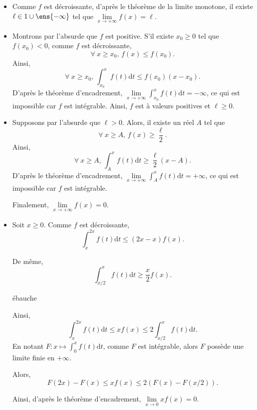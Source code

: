 \begin{elem_sol}
\begin{itemize}
\item Comme $f$ est décroissante, d'après le théorème de la limite monotone, il existe $\ell \in \R \cup \ens{-\infty}$ tel que $\lim\limits_{x\to+\infty} f(x) = \ell$.

\item Montrons par l'absurde que $f$ est positive. S'il existe $x_0 \geq 0$ tel que $f(x_0) < 0$, comme $f$ est décroissante,
\[
\forall\ x \geq x_0,\, f(x) \leq f(x_0).
\]
Ainsi,
\[
\forall\ x \geq x_0,\, \displaystyle\int_{x_0}^x f(t) \mathrm{d}t \leq f(x_0) (x - x_0).
\]
D'après le théorème d'encadrement, $\lim\limits_{x\to+\infty} \displaystyle\int_{x_0}^x f(t) \mathrm{d}t = -\infty$, ce qui est impossible car $f$ est intégrable. Ainsi, $f$ est à valeurs positives et $\ell \geq 0$.

\item Supposons par l'absurde que $\ell > 0$. Alors, il existe un réel $A$ tel que
\[
\forall\ x \geq A,\, f(x) \geq \frac{\ell}{2}.
\]
Ainsi,
\[
\forall\ x \geq A,\, \displaystyle\int_A^x f(t) \mathrm{d}t \geq \frac{\ell}{2} (x - A).
\]
D'après le théorème d'encadrement, $\lim\limits_{x\to+\infty} \displaystyle\int_A^x f(t) \mathrm{d}t = +\infty$, ce qui est impossible car $f$ est intégrable.

Finalement, $\lim\limits_{x\to+\infty} f(x) = 0$.

\item Soit $x \geq 0$. Comme $f$ est décroissante,
\[
\displaystyle\int_x^{2 x} f(t) \mathrm{d}t \leq (2 x - x) f(x).
\]

De même,
\[
\displaystyle\int_{x/2}^x f(t) \mathrm{d}t \geq \frac{x}{2} f(x).
\]

\begin{marginfigure}
    \centering
    
    \caption{ébauche}
\end{marginfigure}



Ainsi,
\[
\displaystyle\int_x^{2 x} f(t) \mathrm{d}t \leq x f(x) \leq 2 \displaystyle\int_{x/2}^x f(t) \mathrm{d}t.
\]
En notant $F : x \mapsto \displaystyle\int_0^x f(t) \mathrm{d}t$, comme $F$ est intégrable, alors $F$ possède une limite finie en $+\infty$.

Alors,
\[
F(2 x) - F(x) \leq x f(x) \leq 2 (F(x) - F(x/2)).
\]

Ainsi, d'après le théorème d'encadrement, $\lim\limits_{x\to 0} x f(x) = 0$.
\end{itemize}
\end{elem_sol}

